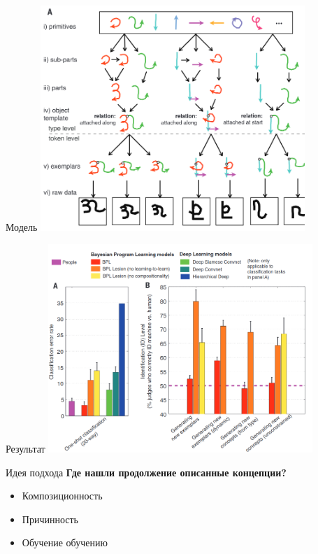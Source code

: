 \documentclass[usenames,dvipsnames,10pt,pdf,utf8,russian,aspectratio=43]{beamer}
\begin{document}
\begin{frame}{Модель}
\centering
\includegraphics[width=0.75\textwidth]{bp4a.png}

\end{frame}


\begin{frame}{Результат}
\centering
\includegraphics[width=0.75\textwidth]{bp6.png}

\end{frame}





\begin{frame}{Идея подхода}
\textbf{Где нашли продолжение описанные концепции?}
\begin{itemize}
\item Композиционность
\item Причинность
\item Обучение обучению
\end{itemize}
\end{frame}
\end{document}
